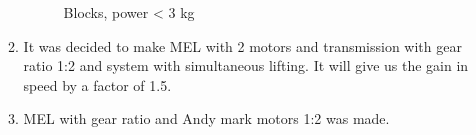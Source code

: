 \begin{enumerate}
\begin{enumerate}
\begin{figure}[H]
\begin{minipage}[h]{0.37\linewidth}
				\caption{Blocks, power < 3 kg}
			\end{minipage}
		\end{figure} 
		
		\item It was decided to make MEL with 2 motors and transmission with gear ratio 1:2 and system with simultaneous lifting. It will give us the gain in speed by a factor of 1.5.
		
		\item MEL with gear ratio and Andy mark motors 1:2 was made.
		

\end{enumerate}
\end{enumerate}
